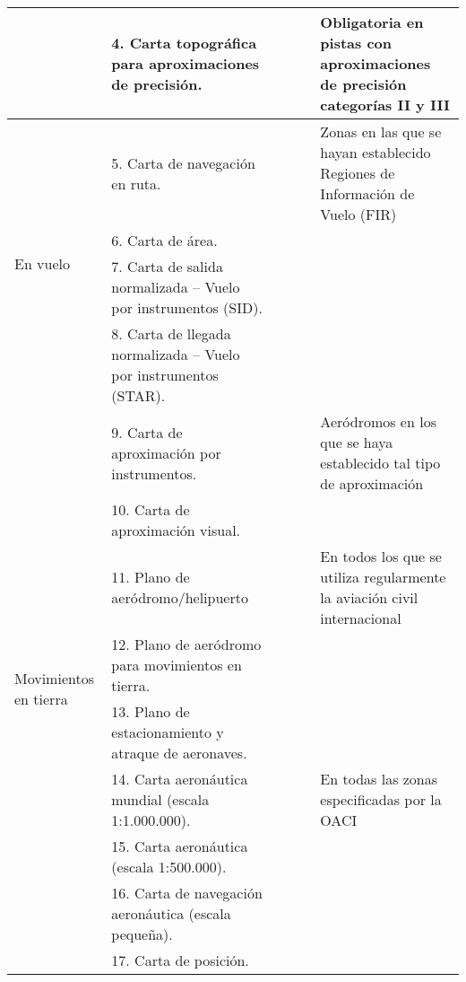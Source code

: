 \begin{landscape}
\begin{table}
\begin{small}
\begin{tabular}{|m{}|m{}|c|c|c|m{}|}
        &
        4. Carta topográfica para aproximaciones de precisión. &\cellcolor{red} & & & Obligatoria en pistas con aproximaciones de precisión categorías II y III\\ \hline
        \multirow{4}{0.12\textwidth}{ En vuelo} &
        5. Carta de navegación en ruta. &\cellcolor{red} & & & 
	Zonas en las que se hayan establecido Regiones de Información de Vuelo (\ac{FIR})	\\
        &
        6. Carta de área. & & &\cellcolor{green} & \\
        &
        7. Carta de salida normalizada – Vuelo por instrumentos (SID). & & &\cellcolor{green} & \\
        &
        8. Carta de llegada normalizada – Vuelo por instrumentos (STAR). & & &\cellcolor{green} & \\
        &
        9. Carta de aproximación por instrumentos. &\cellcolor{red} & & &
        Aeródromos en los que se haya establecido tal tipo de aproximación \\
        &
        10. Carta de aproximación visual.  & & &\cellcolor{green} & \\ \hline
        \multirow{4}{0.12\textwidth}{Movimientos en tierra %
        } &
        11. Plano de aeródromo/helipuerto &\cellcolor{red} & & & 
        En todos los que se utiliza regularmente la aviación civil internacional\\
        &
        12. Plano de aeródromo para movimientos en tierra.  & &\cellcolor{blue} & & \\
        &
        13. Plano de estacionamiento y atraque de aeronaves.  & &\cellcolor{blue} & & \\ \hline
        \multirow{4}{0.12\textwidth}{Navegación aérea visual, trazado de posiciones, planificación} &
        14. Carta aeronáutica mundial (escala 1:1.000.000). & \cellcolor{red}& & & En todas las zonas especificadas por la OACI\\
        &
        15. Carta aeronáutica (escala 1:500.000).  & &\cellcolor{blue} & & \\
        &
        16. Carta de navegación aeronáutica (escala pequeña). & &\cellcolor{blue} & & \\
        &
        17. Carta de posición.  & &\cellcolor{blue} & & \\ \hline
      \end{tabular}
    \end{small}
  \end{table}

\end{landscape}